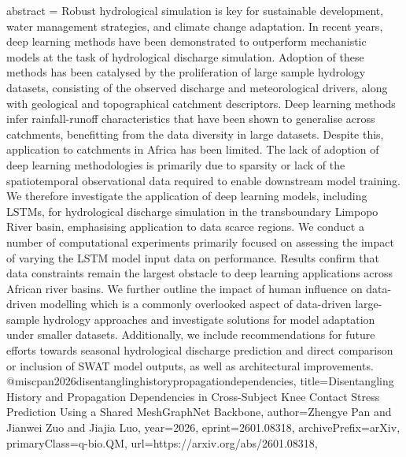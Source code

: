 {      abstract = {Robust hydrological simulation is key for sustainable development, water management strategies, and climate change adaptation. In recent years, deep learning methods have been demonstrated to outperform mechanistic models at the task of hydrological discharge simulation. Adoption of these methods has been catalysed by the proliferation of large sample hydrology datasets, consisting of the observed discharge and meteorological drivers, along with geological and topographical catchment descriptors. Deep learning methods infer rainfall-runoff characteristics that have been shown to generalise across catchments, benefitting from the data diversity in large datasets. Despite this, application to catchments in Africa has been limited. The lack of adoption of deep learning methodologies is primarily due to sparsity or lack of the spatiotemporal observational data required to enable downstream model training. We therefore investigate the application of deep learning models, including LSTMs, for hydrological discharge simulation in the transboundary Limpopo River basin, emphasising application to data scarce regions. We conduct a number of computational experiments primarily focused on assessing the impact of varying the LSTM model input data on performance. Results confirm that data constraints remain the largest obstacle to deep learning applications across African river basins. We further outline the impact of human influence on data-driven modelling which is a commonly overlooked aspect of data-driven large-sample hydrology approaches and investigate solutions for model adaptation under smaller datasets. Additionally, we include recommendations for future efforts towards seasonal hydrological discharge prediction and direct comparison or inclusion of SWAT model outputs, as well as architectural improvements.}
}@misc{pan2026disentanglinghistorypropagationdependencies,
      title={Disentangling History and Propagation Dependencies in Cross-Subject Knee Contact Stress Prediction Using a Shared MeshGraphNet Backbone}, 
      author={Zhengye Pan and Jianwei Zuo and Jiajia Luo},
      year={2026},
      eprint={2601.08318},
      archivePrefix={arXiv},
      primaryClass={q-bio.QM},
      url={https://arxiv.org/abs/2601.08318},
}
